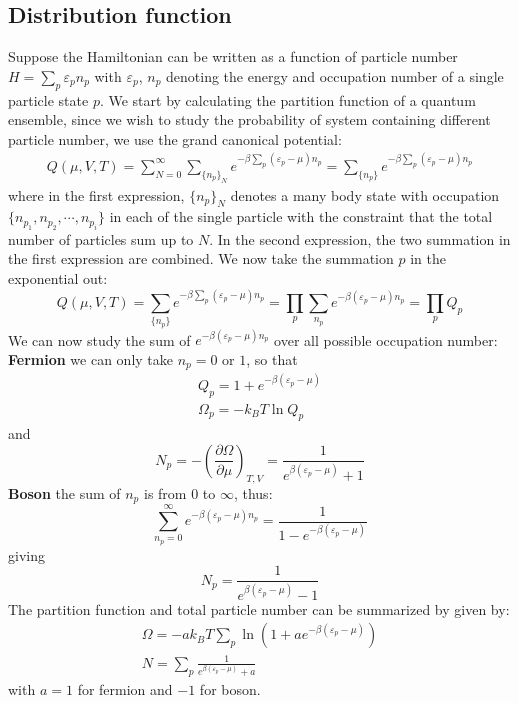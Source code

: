 \documentclass{article}
\begin{document}
\subsection*{Distribution function}
Suppose the Hamiltonian can be written as a function of particle number
$H = \sum_p \varepsilon_p n_p$ with $\varepsilon_p$, $n_p$ denoting 
the energy and occupation number of a single particle state $p$.
We start by calculating the partition function of a quantum ensemble, since we wish 
to study the probability of system containing different particle number, we 
use the grand canonical potential:
\begin{align}
    Q(\mu,V,T) = \sum_{N=0}^{\infty} \sum_{\{n_p\}_N} e^{-\beta\sum_p (\varepsilon_p - \mu) n_p}
               = \sum_{\{n_p\}} e^{-\beta\sum_p (\varepsilon_p - \mu) n_p}
\end{align}
where in the first expression, $\{n_p\}_N$ denotes a many body state with occupation $\{n_{p_1},n_{p_2}, \cdots, n_{p_i}\}$
in each of the single particle with the constraint that the total number of particles sum up to $N$. In the second 
expression, the two summation in the first expression are combined.
We now take the summation $p$ in the exponential out:
\begin{equation}
    Q(\mu,V,T) = \sum_{\{n_p\}} e^{-\beta\sum_p (\varepsilon_p - \mu) n_p} = \prod_p \sum_{n_p} e^{-\beta(\varepsilon_p - \mu) n_p} = \prod_p Q_p
\end{equation}
We can now study the sum of $e^{-\beta(\varepsilon_p - \mu) n_p}$ over all possible occupation number:
\textbf{Fermion}
we can only take $n_p = 0$ or $1$, so that 
\begin{gather}
    Q_p = 1 + e^{-\beta(\varepsilon_p - \mu)} \\
    \Omega_p = -k_BT\ln Q_p
\end{gather}
and 
\begin{equation}
    N_p = -\left(\frac{\partial \Omega}{\partial \mu}\right)_{T,V} = \frac{1}{e^{\beta(\varepsilon_p - \mu)}+1}
\end{equation}
\textbf{Boson}
the sum of $n_p$ is from $0$ to $\infty$, thus:
\begin{equation}
    \sum_{n_p=0}^{\infty} e^{-\beta(\varepsilon_p - \mu) n_p} 
    =\frac{1}{1-e^{-\beta(\varepsilon_p - \mu)}} 
\end{equation}
giving
\begin{equation}
    N_p =  \frac{1}{e^{\beta(\varepsilon_p - \mu)}-1}
\end{equation}
The partition function and total particle number can be summarized by given by:
\begin{gather}
    \Omega = -ak_BT\sum_p\ln(1 + ae^{-\beta(\varepsilon_p - \mu)}) \\
    N = \sum_p \frac{1}{e^{\beta(\varepsilon_p - \mu)} + a}
\end{gather}
with $a = 1$ for fermion and $-1 $ for boson.
\end{document}
